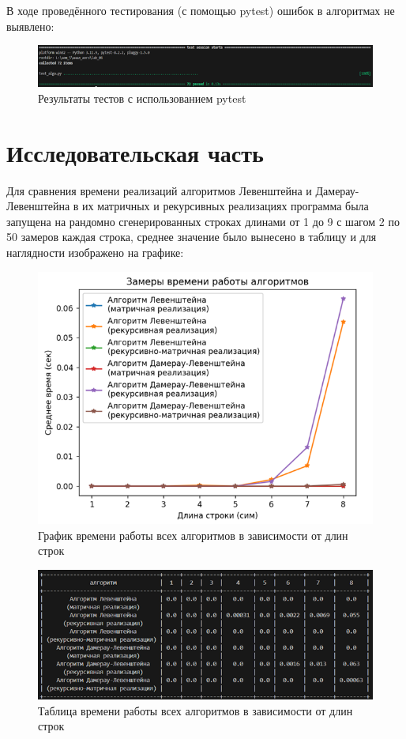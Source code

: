 \documentclass[a4paper,12pt]{article}
\begin{document}
В ходе проведённого тестирования (с помощью pytest) ошибок в алгоритмах не выявлено:\\[0.1cm]
\begin{figure}[H]  %
    \centering
    \includegraphics[width=1\textwidth]{pytest_result.png}
    \caption{Результаты тестов с использованием pytest}
\end{figure}
\newpage

\section{Исследовательская часть}
Для сравнения времени реализаций алгоритмов Левенштейна и Дамерау-Левенштейна в их матричных и рекурсивных реализациях программа была запущена на рандомно сгенерированных строках длинами от 1 до 9 с шагом 2 по 50 замеров каждая строка, среднее значение было вынесено в таблицу и для наглядности изображено на графике:\par
\begin{figure}[H]
    \centering
    \includegraphics[width=1\textwidth]{graph_all.png}
    \caption{График времени работы всех алгоритмов в зависимости от длин строк}
\end{figure}
\begin{figure}[H]
    \centering
    \includegraphics[width=1\textwidth]{table_all.png}
    \caption{Таблица времени работы всех алгоритмов в зависимости от длин строк}
\end{figure}
\end{document}
